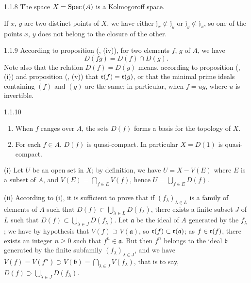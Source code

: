 \begin{envs}[Corollary]{1.1.8}
\label{cor-1.1.1.8}
The space $X={\mathop{\mathrm{Spec}}\nolimits}\,(A)$ is a Kolmogoroff space.
\end{envs}

If $x$, $y$ are two distinct points of $X$, we have either
$\mathfrak{j}_x\not\subset\mathfrak{j}_y$ or $\mathfrak{j}_y\not\subset\mathfrak{j}_x$, so
one of the points $x$, $y$ does not belong to the closure of the other.

\begin{env}{1.1.9}
\label{env-1.1.1.9}
According to proposition (, (iv)), for two elements $f$, $g$ of $A$, we have
\[
  D(fg)=D(f)\cap D(g).
  \tag{1.1.9.1}
\]
Note also that the relation $D(f)=D(g)$ means, according to proposition
(, (i)) and proposition (, (v)) that $\mathfrak{r}(f)=\mathfrak{r}(g)$, or
that the minimal prime ideals containing $(f)$ and $(g)$ are the same; in particular, when
$f=ug$, where $u$ is invertible.
\end{env}

\begin{envs}[Proposition]{1.1.10}
\label{prop-1.1.1.10}
\begin{enumerate}[label=\rm{(\roman*)}]
  \item When $f$ ranges over $A$, the sets $D(f)$ forms a basis for the topology of $X$.
  \item For each $f\in A$, $D(f)$ is quasi-compact. In particular $X=D(1)$ is quasi-compact.
\end{enumerate}
\end{envs}

(i) Let $U$ be an open set in $X$; by definition, we have $U=X-V(E)$ where $E$ is a subset of
$A$, and $V(E)=\bigcap_{f\in E}V(f)$, hence $U=\bigcup_{f\in E}D(f)$.

(ii) According to (i), it is sufficient to prove that if $(f_\lambda)_{\lambda\in L}$ is a
family of elements of $A$ such that $D(f)\subset\bigcup_{\lambda\in L}D(f_\lambda)$, there
exists a finite subset $J$ of $L$ such that $D(f)\subset\bigcup_{\lambda\in J}D(f_\lambda)$.
Let $\mathfrak{a}$ be the ideal of $A$ generated by the $f_\lambda$; we have by hypothesis
that $V(f)\supset V(\mathfrak{a})$, so $\mathfrak{r}(f)\subset\mathfrak{r}(\mathfrak{a})$; as $f\in\mathfrak{r}(f)$,
there exists an integer $n\geqslant 0$ such that $f^n\in\mathfrak{a}$. But then $f^n$ belongs
to the ideal $\mathfrak{b}$ generated by the finite subfamily $(f_\lambda)_{\lambda\in J}$,
and we have $V(f)=V(f^n)\supset V(\mathfrak{b})=\bigcap_{\lambda\in J}V(f_\lambda)$, that is
to say, $D(f)\supset\bigcup_{\lambda\in J}D(f_\lambda)$.

